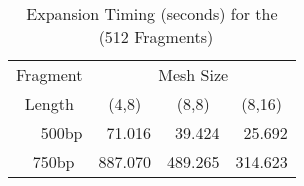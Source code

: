 \begin{table}[bth]
\caption{Expansion Timing (seconds) for the \delta\ (512 Fragments)}
\label{'delta1'}
\begin{center}
\begin{tabular}{||r|rrr||}  \hline
\multicolumn{1}{||c|}{Fragment} & \multicolumn{3}{c||}{Mesh Size} \\ 
\multicolumn{1}{||c|}{Length} & \multicolumn{1}{c}{(4,8)} &
\multicolumn{1}{c}{(8,8)} &
\multicolumn{1}{c||}{(8,16)} \\ \hline
500bp &  71.016 &  39.424 &  25.692 \\
750bp\footnotemark\ & 887.070 & 489.265 & 314.623 \\ \hline
\end{tabular}
\end{center}
\end{table}
